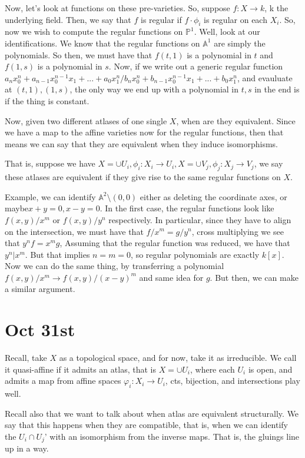 \documentclass[10pt]{article}
\begin{document}
Now, let’s look at functions on these pre-varieties. So, suppose $f: X \to k$, k the underlying field. Then, we say that $f$ is regular if $f \cdot \phi_i$ is regular on each $X_i$. So, now we wish to compute the regular functions on $\mathbb{P}^1$. Well, look at our identifications. We know that the regular functions on $\mathbb{A}^1$ are simply the polynomials. So then, we must have that $f(t,1)$ is a polynomial in $t$ and $f(1,s)$ is a polynomial in $s$. Now, if we write out a generic regular function $a_n x_0^n + a_{n-1} x_0^{n-1} x_1 + ... + a_0 x_1^n/b_n x_0^n + b_{n-1} x_0^{n-1} x_1 + ... + b_0 x_1^n$, and evauluate at $(t,1), (1,s)$, the only way we end up with a polynomial in $t,s$ in the end is if the thing is constant.

Now, given two different atlases of one single $X$, when are they equivalent. Since we have a map to the affine varieties now for the regular functions, then that means we can say that they are equivalent when they induce isomorphisms. 

That is, suppose we have $X = \cup U_i, \phi_i: X_i \to U_i, X = \cup V_j, \phi_j: X_j\to V_j$, we say these atlases are equivalent if they give rise to the same regular functions on $X$.

Example, we can identify $\mathbb{A}^2 \setminus (0,0)$ either as deleting the coordinate axes, or maybe$ x+y = 0, x-y = 0$. In the first case, the regular functions look like $f(x,y)/x^m$ or $f(x,y)/y^n$ respectively. In particular, since they have to align on the intersection, we must have that $f/x^m = g/y^n$, cross multiplying we see that $y^n f = x^m g$, Assuming that the regular function was reduced, we have that $y^n | x^m$. But that implies $n = m = 0$, so regular polynomials are exactly $k[x]$. Now we can do the same thing, by transferring a polynomial $f(x,y)/x^m \to f(x,y)/(x-y)^m$ and same idea for $g$. But then, we can make a similar argument.

\section{Oct 31st}

Recall, take $X$ as a topological space, and for now, take it as irreducible. We call it quasi-affine if it admits an atlas, that is $X = \cup U_i$, where each $U_i$ is open, and admits a map from affine spaces $\varphi_i: X_i \to U_i$, cts, bijection, and intersections play well. 

Recall also that we want to talk about when atlas are equivalent structurally. We say that this happens when they are compatible, that is, when we can identify the $U_i \cap U_j’$ with an isomorphism from the inverse maps. That is, the gluings line up in a way.
\end{document}
